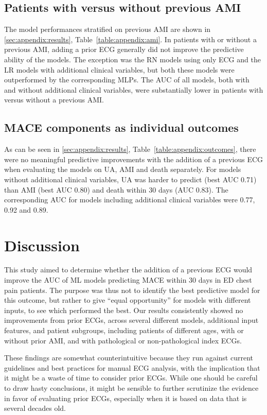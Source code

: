 \documentclass[preprint]{elsarticle}
\begin{document}
\subsection{Patients with versus without previous AMI}
The model performances stratified on previous AMI are shown in \ref{sec:appendix:results}, Table~\ref{table:appendix:ami}. In patients with or without a previous AMI, adding a prior ECG generally did not improve the predictive ability of the models. The exception was the RN models using only ECG and the LR models with additional clinical variables, but both these models were outperformed by the corresponding MLPs. The AUC of all models, both with and without additional clinical variables, were substantially lower in patients with versus without a previous AMI. 

\subsection{MACE components as individual outcomes}
As can be seen in \ref{sec:appendix:results}, Table~\ref{table:appendix:outcomes}, there were no meaningful predictive improvements with the addition of a previous ECG when evaluating the models on UA, AMI and death separately. For models without additional clinical variables, UA was harder to predict (best AUC 0.71) than AMI (best AUC 0.80) and death within 30 days (AUC 0.83). The corresponding AUC for models including additional clinical variables were 0.77, 0.92 and 0.89. 

\section{Discussion}
This study aimed to determine whether the addition of a previous ECG would improve the AUC of ML models predicting MACE within 30 days in ED chest pain patients. The purpose was thus not to identify the best predictive model for this outcome, but rather to give ``equal opportunity'' for models with different inputs, to see which performed the best. Our results consistently showed no improvements from prior ECGs, across several different models, additional input features, and patient subgroups, including patients of different ages, with or without prior AMI, and with pathological or non-pathological index ECGs.

These findings are somewhat counterintuitive because they run against current guidelines and best practices for manual ECG analysis, with the implication that it might be a waste of time to consider prior ECGs. While one should be careful to draw hasty conclusions, it might be sensible to further scrutinize the evidence in favor of evaluating prior ECGs, especially when it is based on data that is several decades old.
\end{document}
